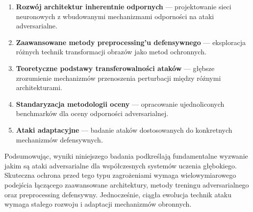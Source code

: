 \documentclass[12pt]{article}
\begin{document}
\begin{enumerate}
    \item \textbf{Rozwój architektur inherentnie odpornych} --- projektowanie sieci neuronowych z wbudowanymi mechanizmami odporności na ataki adversarialne.
    
    \item \textbf{Zaawansowane metody preprocessing'u defensywnego} --- eksploracja różnych technik transformacji obrazów jako metod ochronnych.
    
    \item \textbf{Teoretyczne podstawy transferowalności ataków} --- głębsze zrozumienie mechanizmów przenoszenia perturbacji między różnymi architekturami.
    
    \item \textbf{Standaryzacja metodologii oceny} --- opracowanie ujednoliconych benchmarków dla oceny odporności adversarialnej.
    
    \item \textbf{Ataki adaptacyjne} --- badanie ataków dostosowanych do konkretnych mechanizmów defensywnych.
\end{enumerate}

Podsumowując, wyniki niniejszego badania podkreślają fundamentalne wyzwanie jakim są ataki adversarialne dla współczesnych systemów uczenia głębokiego. Skuteczna ochrona przed tego typu zagrożeniami wymaga wielowymiarowego podejścia łączącego zaawansowane architektury, metody treningu adversarialnego oraz preprocessing defensywny. Jednocześnie, ciągła ewolucja technik ataku wymaga stałego rozwoju i adaptacji mechanizmów obronnych.

\printbibliography
\end{document}
